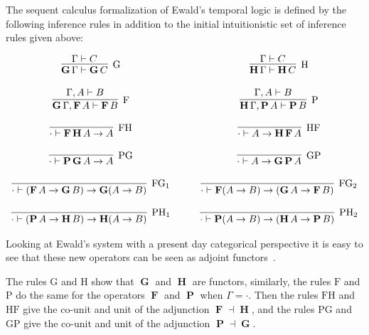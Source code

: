 \documentclass{article}
\newcommand{\F}{\mathop{\textbf{F}}}
\renewcommand{\P}{\mathop{\textbf{P}}}
\newcommand{\G}{\mathop{\textbf{G}}}
\renewcommand{\H}{\mathop{\textbf{H}}}
\begin{document}
The sequent calculus formalization of Ewald's temporal logic is
defined by the following inference rules in addition to the initial
intuitionistic set of inference rules given above:
\begin{center}
  \small
  \begin{math}
    \begin{array}{cccccc}
      \infer[\text{G}]{\G \Gamma \vdash \G C}{
        \Gamma \vdash C
      }
      & \quad &
      \infer[\text{H}]{\H\Gamma \vdash \H C}{
        \Gamma \vdash C
      }\\\\
      \infer[\text{F}]{\G\Gamma,\F A \vdash \F B}{
        \Gamma,A \vdash B
      }
      & \quad &
      \infer[\text{P}]{\H\Gamma,\P A \vdash \P B}{
        \Gamma,A \vdash B
      }\\\\
      \infer[\text{FH}]{\cdot \vdash \F\H A \to A}{
        \,
      }
      & \quad &
      \infer[\text{HF}]{\cdot \vdash A \to \H\F A}{
        \,
      }\\\\
      \infer[\text{PG}]{\cdot \vdash \P\G A \to A}{
        \,
      }
      & \quad &
      \infer[\text{GP}]{\cdot \vdash A \to \G\P A}{
        \,
      }\\\\
      \infer[\text{FG}_1]{\cdot \vdash (\F A \to \G B) \to \G(A \to B)}{
        \,
      }
      & \quad &
      \infer[\text{FG}_2]{\cdot \vdash \F(A \to B) \to (\G A \to \F B)}{
        \,
      }\\\\
      \infer[\text{PH}_1]{\cdot \vdash (\P A \to \H B) \to \H(A \to B)}{
        \,
      }
      & \quad &
      \infer[\text{PH}_2]{\cdot \vdash \P(A \to B) \to (\H A \to \P B)}{
        \,
      }      
    \end{array}
  \end{math}
\end{center}
Looking at Ewald's system with a present day categorical perspective
it is easy to see that these new operators can be seen as adjoint
functors~\cite{Menni:2014}.

The rules $\text{G}$ and $\text{H}$ show that $\G$ and $\H$ are
functors, similarly, the rules $\text{F}$ and $\text{P}$ do the same
for the operators $\F$ and $\P$ when $\Gamma = \cdot$.  Then the rules
$\text{FH}$ and $\text{HF}$ give the co-unit and unit of the
adjunction $\F \dashv \H$, and the rules $\text{PG}$ and $\text{GP}$
give the co-unit and unit of the adjunction $\P \dashv \G$.
\end{document}
